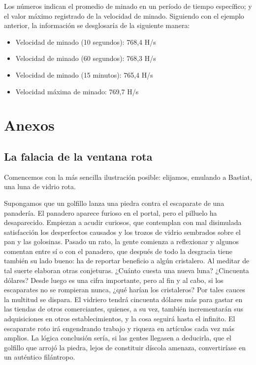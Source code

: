 \documentclass[12pt,a4paper,twoside]{book}
\begin{document}
Los números indican el promedio de minado en un período de tiempo específico; y el valor máximo registrado de la velocidad de minado. Siguiendo con el ejemplo anterior, la información se desglosaría de la siguiente manera:

\begin{itemize}
\item Velocidad de minado (10 segundos): 768,4 H/s
\item Velocidad de minado (60 segundos): 768,3 H/s
\item Velocidad de minado (15 minutos): 765,4 H/s
\item Velocidad máxima de minado: 769,7 H/s
\end{itemize}

\part{Anexos}

\chapter{La falacia de la ventana rota}
Comencemos con la más sencilla ilustración posible: elijamos, emulando a Bastiat, una luna de vidrio rota.

Supongamos que un golfillo lanza una piedra contra el escaparate de una panadería. El panadero aparece furioso en el portal, pero el pilluelo ha desaparecido. Empiezan a acudir curiosos, que contemplan con mal disimulada satisfacción los desperfectos causados y los trozos de vidrio sembrados sobre el pan y las golosinas. Pasado un rato, la gente comienza a reflexionar y algunos comentan entre sí o con el panadero, que después de todo la desgracia tiene también su lado bueno: ha de reportar beneficio a algún cristalero. Al meditar de tal suerte elaboran otras conjeturas. ¿Cuánto cuesta una nueva luna? ¿Cincuenta dólares? Desde luego es una cifra importante, pero al fin y al cabo, si los escaparates no se rompieran nunca, ¿qué harían los cristaleros? Por tales cauces la multitud se dispara. El vidriero tendrá cincuenta dólares más para gastar en las tiendas de otros comerciantes, quienes, a su vez, también incrementarán sus adquisiciones en otros establecimientos, y la cosa seguirá hasta el infinito. El escaparate roto irá engendrando trabajo y riqueza en artículos cada vez más amplios. La lógica conclusión sería, si las gentes llegasen a deducirla, que el golfillo que arrojó la piedra, lejos de constituir díscola amenaza, convertiríase en un auténtico filántropo.
\end{document}
